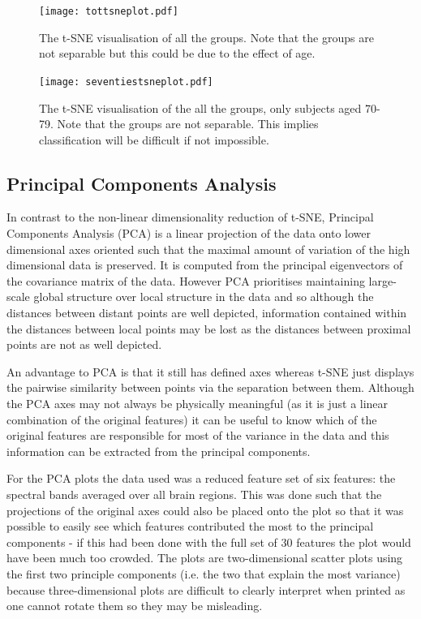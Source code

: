 \begin{figure}[h!]
  \centering
    \texttt{[image: tottsneplot.pdf]}
    \caption{The t-SNE visualisation of all the groups. Note that the groups are not separable but this could be due to the effect of age.}
    \label{fig:tottsneplot}
\end{figure}


\begin{figure}[h!]
  \centering
    \texttt{[image: seventiestsneplot.pdf]}
    \caption{The t-SNE visualisation of the all the groups, only subjects aged 70-79. Note that the groups are not separable. This implies classification will be difficult if not impossible.}
    \label{fig:seventiestsneplot}
\end{figure}



\subsection{Principal Components Analysis}

In contrast to the non-linear dimensionality reduction of t-SNE, Principal Components Analysis (PCA) is a linear projection of the data onto lower dimensional axes oriented such that the maximal amount of variation of the high dimensional data is preserved. \cite{Bushati2011} It is computed from the principal eigenvectors of the covariance matrix of the data. However PCA prioritises maintaining large-scale global structure over local structure in the data and so although the distances between distant points are well depicted, information contained within the distances between local points may be lost as the distances between proximal points are not as well depicted.

An advantage to PCA is that it still has defined axes whereas t-SNE just displays the pairwise similarity between points via the separation between them. Although the PCA axes may not always be physically meaningful (as it is just a linear combination of the original features) it can be useful to know which of the original features are responsible for most of the variance in the data and this information can be extracted from the principal components.

For the PCA plots the data used was a reduced feature set of six features: the spectral bands averaged over all brain regions. This was done such that the projections of the original axes could also be placed onto the plot so that it was possible to easily see which features contributed the most to the principal components - if this had been done with the full set of 30 features the plot would have been much too crowded. The plots are two-dimensional scatter plots using the first two principle components (i.e. the two that explain the most variance) because three-dimensional plots are difficult to clearly interpret when printed as one cannot rotate them so they may be misleading.

